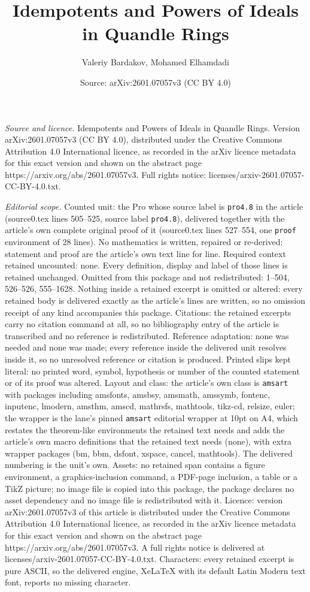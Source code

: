 \documentclass[10pt,a4paper]{amsart}
\title[Idempotents and Powers of Ideals in Quandle Rings]{Idempotents and Powers of Ideals in Quandle Rings}
\author{Valeriy Bardakov, Mohamed Elhamdadi}
\date{Source: arXiv:2601.07057v3 (CC BY 4.0)}
\begin{document}
\maketitle

\noindent\emph{Source and licence.} Idempotents and Powers of Ideals in Quandle Rings. Version arXiv:2601.07057v3 (CC BY 4.0), distributed under the Creative Commons Attribution 4.0 International licence, as recorded in the arXiv licence metadata for this exact version and shown on the abstract page https://arxiv.org/abs/2601.07057v3. Full rights notice: licenses/arxiv-2601.07057-CC-BY-4.0.txt.\par\smallskip

\noindent\textit{Editorial scope.} Counted unit: the Pro whose source label is \texttt{pro4.8} in the article (source0.tex lines 505--525, source label \texttt{pro4.8}), delivered together with the article's own complete original proof of it (source0.tex lines 527--554, one \texttt{proof} environment of 28 lines). No mathematics is written, repaired or re-derived: statement and proof are the article's own text line for line. Required context retained uncounted: none. Every definition, display and label of those lines is retained unchanged. Omitted from this package and not redistributed: 1--504, 526--526, 555--1628. Nothing inside a retained excerpt is omitted or altered: every retained body is delivered exactly as the article's lines are written, so no omission receipt of any kind accompanies this package. Citations: the retained excerpts carry no citation command at all, so no bibliography entry of the article is transcribed and no reference is redistributed. Reference adaptation: none was needed and none was made; every reference inside the delivered unit resolves inside it, so no unresolved reference or citation is produced. Printed slips kept literal: no printed word, symbol, hypothesis or number of the counted statement or of its proof was altered. Layout and class: the article's own class is \texttt{amsart} with packages including amsfonts, amsbsy, amsmath, amssymb, fontenc, inputenc, lmodern, amsthm, amscd, mathrsfs, mathtools, tikz-cd, relsize, euler; the wrapper is the lane's pinned \texttt{amsart} editorial wrapper at 10pt on A4, which restates the theorem-like environments the retained text needs and adds the article's own macro definitions that the retained text needs (none), with extra wrapper packages (bm, bbm, dsfont, xspace, cancel, mathtools). The delivered numbering is the unit's own. Assets: no retained span contains a figure environment, a graphics-inclusion command, a PDF-page inclusion, a table or a TikZ picture; no image file is copied into this package, the package declares no asset dependency and no image file is redistributed with it. Licence: version arXiv:2601.07057v3 of this article is distributed under the Creative Commons Attribution 4.0 International licence, as recorded in the arXiv licence metadata for this exact version and shown on the abstract page https://arxiv.org/abs/2601.07057v3. A full rights notice is delivered at licenses/arxiv-2601.07057-CC-BY-4.0.txt. Characters: every retained excerpt is pure ASCII, so the delivered engine, XeLaTeX with its default Latin Modern text font, reports no missing character.
\end{document}
